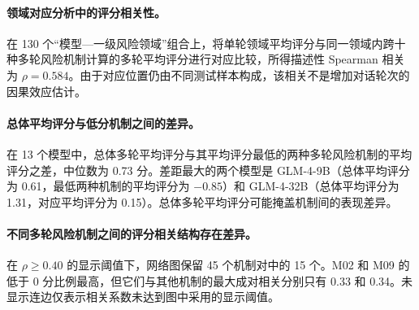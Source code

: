 \paragraph{领域对应分析中的评分相关性。}
在 130 个“模型—一级风险领域”组合上，将单轮领域平均评分与同一领域内跨十种多轮风险机制计算的多轮平均评分进行对应比较，所得描述性 Spearman 相关为 $\rho=0.584$。由于对应位置仍由不同测试样本构成，该相关不是增加对话轮次的因果效应估计。

\paragraph{总体平均评分与低分机制之间的差异。}
在 13 个模型中，总体多轮平均评分与其平均评分最低的两种多轮风险机制的平均评分之差，中位数为 0.73 分。差距最大的两个模型是 GLM-4-9B（总体平均评分为 0.61，最低两种机制的平均评分为 $-0.85$）和 GLM-4-32B（总体平均评分为 1.31，对应平均评分为 0.15）。总体多轮平均评分可能掩盖机制间的表现差异。

\paragraph{不同多轮风险机制之间的评分相关结构存在差异。}
在 $\rho\geq0.40$ 的显示阈值下，网络图保留 45 个机制对中的 15 个。M02 和 M09 的低于 0 分比例最高，但它们与其他机制的最大成对相关分别只有 0.33 和 0.34。未显示连边仅表示相关系数未达到图中采用的显示阈值。
